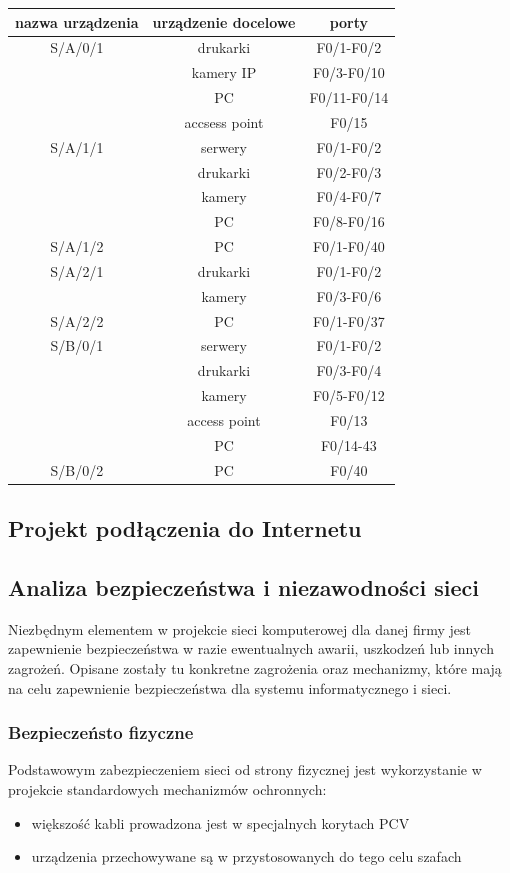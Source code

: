 \documentclass{article}
\begin{document}
	\begin{tabular}[!ht]{c|c|c}
	nazwa urządzenia & urządzenie docelowe &porty\\
	\hline	
S/A/0/1 &	drukarki&	F0/1-F0/2\\
&kamery IP	&F0/3-F0/10\\
&PC	&F0/11-F0/14\\
&accsess point&	F0/15\\
\hline

S/A/1/1&	serwery&	F0/1-F0/2\\
&drukarki&	F0/2-F0/3\\
&kamery&	F0/4-F0/7\\
&PC&	F0/8-F0/16\\
\hline

S/A/1/2	&PC&	F0/1-F0/40\\
\hline

S/A/2/1&	drukarki&	F0/1-F0/2\\
&kamery&F0/3-F0/6\\
\hline

S/A/2/2&	PC	&F0/1-F0/37\\
\hline

S/B/0/1	&serwery	&F0/1-F0/2\\
&drukarki&	F0/3-F0/4\\
&kamery	&F0/5-F0/12\\
&access point&	F0/13\\
&PC	&F0/14-43\\
\hline

S/B/0/2	&PC	&F0/40\\
\hline
\end{tabular}
\subsection{Projekt podłączenia do Internetu}

\subsection{Analiza bezpieczeństwa i niezawodności sieci}
Niezbędnym elementem w projekcie sieci komputerowej dla danej firmy jest zapewnienie bezpieczeństwa w razie ewentualnych awarii, uszkodzeń lub innych zagrożeń. Opisane zostały tu konkretne zagrożenia oraz mechanizmy, które mają na celu zapewnienie bezpieczeństwa dla systemu informatycznego i sieci.

\subsubsection{Bezpieczeństo fizyczne}
Podstawowym zabezpieczeniem sieci od strony fizycznej jest wykorzystanie w projekcie standardowych mechanizmów
ochronnych:
\begin{itemize}
	\item większość kabli prowadzona jest w specjalnych korytach PCV
	\item urządzenia przechowywane są w przystosowanych do tego celu szafach
\end{itemize}
\end{document}
